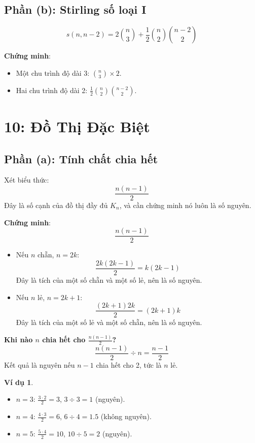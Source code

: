 \documentclass[a4paper,12pt]{article}
\theoremstyle{plain}
\theoremstyle{definition}
\newtheorem{example}{Ví dụ}
\begin{document}
\subsection*{Phần (b): Stirling số loại I}
\[
s(n,n-2) = 2\binom{n}{3} + \frac{1}{2}\binom{n}{2}\binom{n-2}{2}
\]

\textbf{Chứng minh}:
\begin{itemize}
    \item Một chu trình độ dài 3: \( \binom{n}{3} \times 2 \).
    \item Hai chu trình độ dài 2: \( \frac{1}{2}\binom{n}{2}\binom{n-2}{2} \).
\end{itemize}



\section*{10: Đồ Thị Đặc Biệt}

\subsection*{Phần (a): Tính chất chia hết}

Xét biểu thức:
\[
\frac{n(n-1)}{2}
\]
Đây là số cạnh của đồ thị đầy đủ \( K_n \), và cần chứng minh nó luôn là số nguyên.

\textbf{Chứng minh}:
\[
\frac{n(n-1)}{2}
\]
\begin{itemize}
    \item Nếu \( n \) chẵn, \( n = 2k \):
    \[
    \frac{2k(2k-1)}{2} = k(2k-1)
    \]
    Đây là tích của một số chẵn và một số lẻ, nên là số nguyên.
    \item Nếu \( n \) lẻ, \( n = 2k+1 \):
    \[
    \frac{(2k+1)2k}{2} = (2k+1)k
    \]
    Đây là tích của một số lẻ và một số chẵn, nên là số nguyên.
\end{itemize}

\textbf{Khi nào \( n \) chia hết cho \( \frac{n(n-1)}{2} \)?}
\[
\frac{n(n-1)}{2} \div n = \frac{n-1}{2}
\]
Kết quả là nguyên nếu \( n-1 \) chia hết cho 2, tức là \( n \) lẻ.

\begin{example}
\begin{itemize}
    \item \( n=3 \): \( \frac{3 \cdot 2}{2} = 3 \), \( 3 \div 3 = 1 \) (nguyên).
    \item \( n=4 \): \( \frac{4 \cdot 3}{2} = 6 \), \( 6 \div 4 = 1.5 \) (không nguyên).
    \item \( n=5 \): \( \frac{5 \cdot 4}{2} = 10 \), \( 10 \div 5 = 2 \) (nguyên).
\end{itemize}
\end{example}
\end{document}
